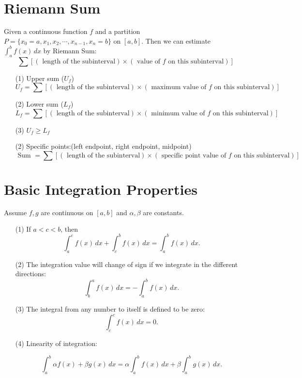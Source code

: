 \documentclass[12pt]{article}
\begin{document}






\section{Riemann Sum}
Given a continuous function $f$ and a partition $P=\{x_0=a, x_1, x_2, \cdots, x_{n-1}, x_n=b\}$ on $[a,b]$.
Then we can estimate $\int_{a}^{b} f(x)\, dx$ by Riemann Sum:
$$\sum [(\text{ length of the subinterval})\times (\text{ value of $f$ on this subinterval})]$$
\begin{itemize}
\item[(1)] Upper sum ($U_f$)
$$ U_f=\sum [(\text{ length of the subinterval})\times (\text{ maximum value of $f$ on this subinterval})]$$

\item[(2)] Lower sum ($L_f$)
$$ L_f=\sum [(\text{ length of the subinterval})\times (\text{ minimum value of $f$ on this subinterval})]$$

\item[(3)] $U_f \geq L_f$

\item[(2)] Specific points:(left endpoint, right endpoint, midpoint) 
$$ \text{ Sum }=\sum [(\text{ length of the subinterval})\times (\text{ specific point value of $f$ on this subinterval})]$$

\end{itemize}
\section{Basic Integration Properties}
Assume $f,g$ are continuous on $[a,b]$ and $\alpha, \beta$ are constants.
\begin{itemize}
\item[(1)] If $a<c<b$, then
$$\int_{a}^{c} f(x)\, dx+\int_{c}^{b} f(x)\, dx=\int_{a}^{b} f(x)\, dx.$$

\item[(2)] The integration value will change of sign if we integrate in the different directions:
$$\int_{b}^{a} f(x)\, dx=-\int_{a}^{b} f(x)\, dx.$$

\item[(3)] The integral from any number to itself is defined to be zero:
$$\int_{c}^{c} f(x)\, dx=0.$$

\item[(4)] Linearity of integration:

$$\int_{a}^{b} \alpha f(x) +\beta g(x)\, dx=\alpha \int_{a}^{b} f(x)\, dx + \beta \int_{a}^{b} g(x)\, dx.$$



\end{itemize}
\end{document}
